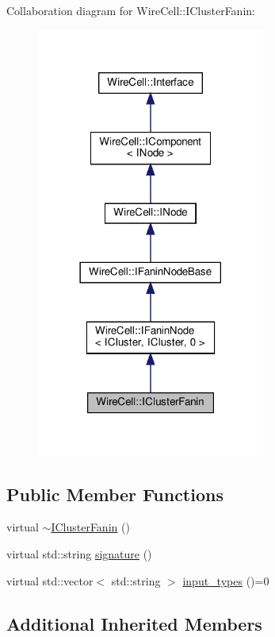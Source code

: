 Collaboration diagram for Wire\+Cell\+:\+:I\+Cluster\+Fanin\+:
\nopagebreak
\begin{figure}[H]
\begin{center}
\leavevmode
\includegraphics[width=213pt]{class_wire_cell_1_1_i_cluster_fanin__coll__graph}
\end{center}
\end{figure}
\subsection*{Public Member Functions}
\begin{DoxyCompactItemize}
\item 
virtual \hyperlink{class_wire_cell_1_1_i_cluster_fanin_a139c9e421801b80c19e3270622221e2f}{$\sim$\+I\+Cluster\+Fanin} ()
\item 
virtual std\+::string \hyperlink{class_wire_cell_1_1_i_cluster_fanin_ab6830dadbc5f673427ccaef1b4521023}{signature} ()
\item 
virtual std\+::vector$<$ std\+::string $>$ \hyperlink{class_wire_cell_1_1_i_cluster_fanin_a4021793d08233b3cb10f788d20d313c2}{input\+\_\+types} ()=0
\end{DoxyCompactItemize}
\subsection*{Additional Inherited Members}


